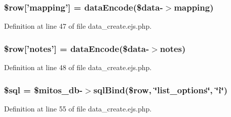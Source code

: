 \hypertarget{administration_2lists_2data__create_8ejs_8php_ad4c649a633b36e8ca62f63391a3279a6}{
\subsubsection[{\$row}]{\setlength{\rightskip}{0pt plus 5cm}\$row\mbox{[}'mapping'\mbox{]} = {\bf data\-Encode}(\$data-\/$>$mapping)}}\label{administration_2lists_2data__create_8ejs_8php_ad4c649a633b36e8ca62f63391a3279a6}


\-Definition at line 47 of file data\-\_\-create.\-ejs.\-php.

\hypertarget{administration_2lists_2data__create_8ejs_8php_a6cd140f95df717cfed217fe478482645}{
\subsubsection[{\$row}]{\setlength{\rightskip}{0pt plus 5cm}\$row\mbox{[}'notes'\mbox{]} = {\bf data\-Encode}(\$data-\/$>$notes)}}\label{administration_2lists_2data__create_8ejs_8php_a6cd140f95df717cfed217fe478482645}


\-Definition at line 48 of file data\-\_\-create.\-ejs.\-php.

\hypertarget{administration_2lists_2data__create_8ejs_8php_a047170d6020a882807665812a27e2525}{
\subsubsection[{\$sql}]{\setlength{\rightskip}{0pt plus 5cm}\$sql = \$mitos\-\_\-db-\/$>$sql\-Bind(\$row, \char`\"{}list\-\_\-options\char`\"{}, \char`\"{}i\char`\"{})}}\label{administration_2lists_2data__create_8ejs_8php_a047170d6020a882807665812a27e2525}


\-Definition at line 55 of file data\-\_\-create.\-ejs.\-php.

